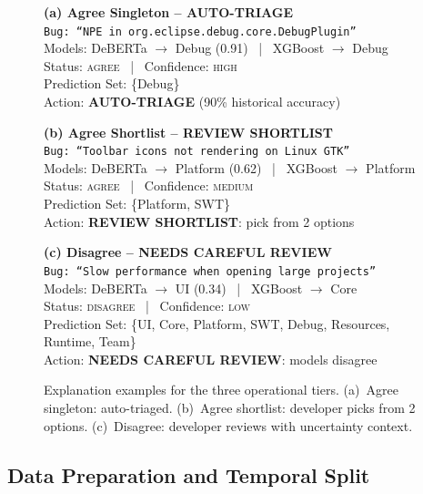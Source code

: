 \documentclass[conference]{IEEEtran}
\begin{document}
\begin{figure}[t]
\centering
\footnotesize
\setlength{\fboxsep}{4pt}

\noindent\colorbox{green!8}{\parbox{0.95\columnwidth}{
\textbf{(a) Agree Singleton -- AUTO-TRIAGE}\\[2pt]
\texttt{Bug: ``NPE in org.eclipse.debug.core.DebugPlugin''}\\
Models: DeBERTa $\to$ Debug (0.91) ~|~ XGBoost $\to$ Debug\\
Status: \textsc{agree} ~|~ Confidence: \textsc{high}\\
Prediction Set: \{Debug\}\\
Action: \textbf{AUTO-TRIAGE} (90\% historical accuracy)
}}

\vspace{3pt}
\noindent\colorbox{yellow!10}{\parbox{0.95\columnwidth}{
\textbf{(b) Agree Shortlist -- REVIEW SHORTLIST}\\[2pt]
\texttt{Bug: ``Toolbar icons not rendering on Linux GTK''}\\
Models: DeBERTa $\to$ Platform (0.62) ~|~ XGBoost $\to$ Platform\\
Status: \textsc{agree} ~|~ Confidence: \textsc{medium}\\
Prediction Set: \{Platform, SWT\}\\
Action: \textbf{REVIEW SHORTLIST}: pick from 2 options
}}

\vspace{3pt}
\noindent\colorbox{red!6}{\parbox{0.95\columnwidth}{
\textbf{(c) Disagree -- NEEDS CAREFUL REVIEW}\\[2pt]
\texttt{Bug: ``Slow performance when opening large projects''}\\
Models: DeBERTa $\to$ UI (0.34) ~|~ XGBoost $\to$ Core\\
Status: \textsc{disagree} ~|~ Confidence: \textsc{low}\\
Prediction Set: \{UI, Core, Platform, SWT, Debug, Resources, Runtime, Team\}\\
Action: \textbf{NEEDS CAREFUL REVIEW}: models disagree
}}

\caption{Explanation examples for the three operational tiers. (a)~Agree singleton: auto-triaged. (b)~Agree shortlist: developer picks from 2 options. (c)~Disagree: developer reviews with uncertainty context.}
\label{fig:explanation}
\end{figure}

\subsection{Data Preparation and Temporal Split}
\end{document}

